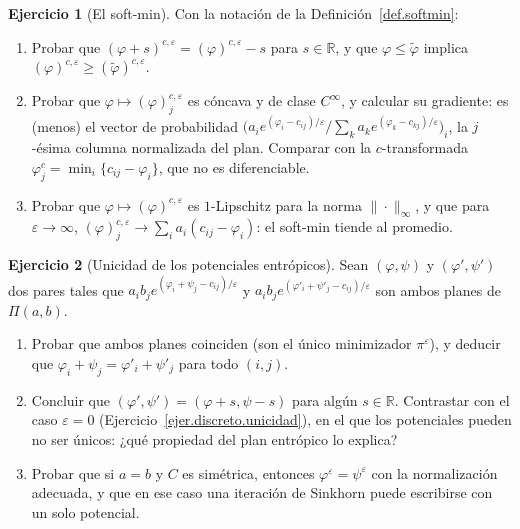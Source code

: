 \documentclass[12pt, a4paper]{amsbook}
\newcommand{\ve}{\varepsilon}
\newcommand{\R}{{\mathbb R}}
\theoremstyle{remark}
\theoremstyle{definition}
\newtheorem{ejercicio}{Ejercicio}[chapter]
\numberwithin{section}{chapter}
\numberwithin{subsection}{section}
\numberwithin{equation}{section}
\numberwithin{figure}{chapter}
\begin{document}
\begin{ejercicio}[El soft-min]\label{ejer.softmin}
Con la notación de la Definición~\ref{def.softmin}:
\begin{enumerate}[label=(\alph*)]
\item Probar que $(\varphi+s)^{c,\ve}=(\varphi)^{c,\ve}-s$ para $s\in\R$, y
que $\varphi\le\tilde\varphi$ implica $(\varphi)^{c,\ve}\ge(\tilde\varphi)^{c,\ve}$.
\item Probar que $\varphi\mapsto(\varphi)^{c,\ve}_j$ es cóncava y de clase
$C^\infty$, y calcular su gradiente: es (menos) el vector de probabilidad
$\bigl(a_ie^{(\varphi_i-c_{ij})/\ve}/\sum_ka_ke^{(\varphi_k-c_{kj})/\ve}\bigr)_i$,
la $j$-ésima columna normalizada del plan. Comparar con la $c$-transformada
$\varphi^c_j=\min_i\{c_{ij}-\varphi_i\}$, que no es diferenciable.
\item Probar que $\varphi\mapsto(\varphi)^{c,\ve}$ es $1$-Lipschitz para la
norma $\|\cdot\|_\infty$, y que para $\ve\to\infty$,
$(\varphi)^{c,\ve}_j\to\sum_ia_i(c_{ij}-\varphi_i)$: el soft-min tiende al
promedio.
\end{enumerate}
\end{ejercicio}

\begin{ejercicio}[Unicidad de los potenciales entrópicos]\label{ejer.potenciales.eps.unicidad}
Sean $(\varphi,\psi)$ y $(\varphi',\psi')$ dos pares tales que
$a_ib_je^{(\varphi_i+\psi_j-c_{ij})/\ve}$ y $a_ib_je^{(\varphi'_i+\psi'_j-c_{ij})/\ve}$
son ambos planes de $\Pi(a,b)$.
\begin{enumerate}[label=(\alph*)]
\item Probar que ambos planes coinciden (son el único minimizador
$\pi^\ve$), y deducir que $\varphi_i+\psi_j=\varphi'_i+\psi'_j$ para todo
$(i,j)$.
\item Concluir que $(\varphi',\psi')=(\varphi+s,\psi-s)$ para algún $s\in\R$.
Contrastar con el caso $\ve=0$ (Ejercicio~\ref{ejer.discreto.unicidad}), en
el que los potenciales pueden no ser únicos: ¿qué propiedad del plan
entrópico lo explica?
\item Probar que si $a=b$ y $C$ es simétrica, entonces $\varphi^\ve=\psi^\ve$
con la normalización adecuada, y que en ese caso una iteración de Sinkhorn
puede escribirse con un solo potencial.
\end{enumerate}
\end{ejercicio}
\end{document}

